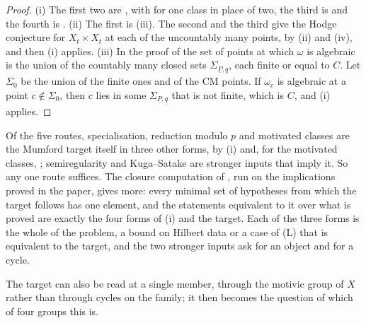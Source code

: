 \begin{proof}
(i) The first two are , with 
for one class in place of two, the third is  and the
fourth is . (ii) The first is
(iii). The second and the third give the Hodge
conjecture for $X_{t}\times X_{t}$ at each of the uncountably many points, by
(ii) and (iv), and then (i) applies.
(iii) In the proof of  the set of points at which
$\omega$ is algebraic is the union of the countably many closed sets
$\Sigma_{\underline{P},\underline{q}}$, each finite or equal to $C$. Let
$\Sigma_{0}$ be the union of the finite ones and of the CM points. If
$\omega_{c}$ is algebraic at a point $c\notin\Sigma_{0}$, then $c$ lies in
some $\Sigma_{\underline{P},\underline{q}}$ that is not finite, which is $C$,
and (i) applies.
\end{proof}

\begin{remark}\label{rem:mumfordneeded}
Of the five routes, specialisation, reduction modulo $p$ and motivated
classes are the Mumford target itself in three other forms, by
(i) and, for the motivated classes,
; semiregularity and Kuga--Satake are stronger inputs
that imply it. So any one route suffices. The closure computation of
\cite{BMB26}, run on the implications proved in the paper, gives more: every
minimal set of hypotheses from which the
target follows has one element, and the statements equivalent to it over what
is proved are exactly the four forms of (i) and the target. Each of the three
forms is the whole of the problem, a bound on Hilbert data or a case of
\textup{(L)} that is equivalent to the target, and the two stronger inputs
ask for an object and for a cycle.
\end{remark}

The target can also be read at a single member, through the motivic group of
$X$ rather than through cycles on the family; it then becomes the question of
which of four groups this is.

